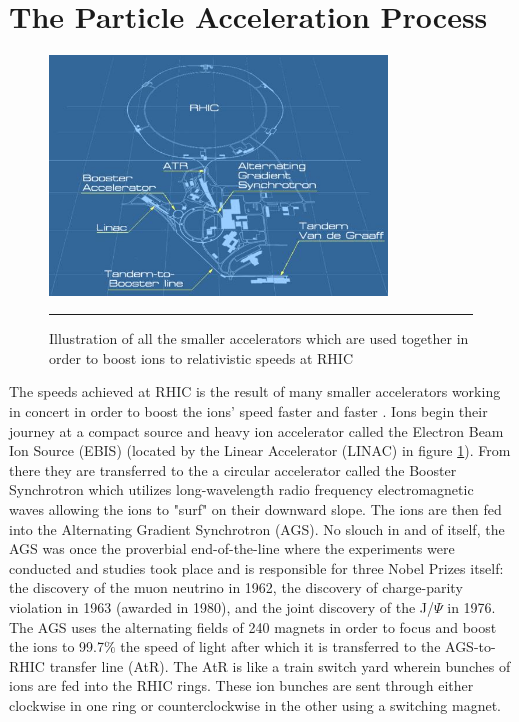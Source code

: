 \section{The Particle Acceleration Process}
\begin{figure}[htbp]
  \centering
    \includegraphics[width=0.8\textwidth]{Figures/RHICdiagram.JPG}
    \rule{35em}{0.5pt}
  \caption[Illustration of all the accelerators used to boost ions to relativistic speeds at RHIC]{Illustration of all the smaller accelerators which are used together in order to boost ions to relativistic speeds at RHIC}
  \label{fig:RHICdiagram}
\end{figure}
The speeds achieved at RHIC is the result of many smaller accelerators working in concert in order to boost the ions' speed faster and faster \citep{RHICaccel}.  Ions begin their journey at a compact source and heavy ion accelerator called the Electron Beam Ion Source (EBIS) (located by the Linear Accelerator (LINAC) in figure \ref{fig:RHICdiagram}). From there they are transferred to the a circular accelerator called the Booster Synchrotron which utilizes long-wavelength radio frequency electromagnetic waves allowing the ions to "surf" on their downward slope. The ions are then fed into the Alternating Gradient Synchrotron (AGS). No slouch in and of itself, the AGS was once the proverbial end-of-the-line where the experiments were conducted and studies took place and is responsible for three Nobel Prizes itself: the discovery of the muon neutrino in 1962, the discovery of charge-parity violation in 1963 (awarded in 1980), and the joint discovery of the J/$\Psi$ in 1976. The AGS uses the alternating fields of 240 magnets in order to focus and boost the ions to 99.7$\%$ the speed of light after which it is transferred to the AGS-to-RHIC transfer line (AtR). The AtR is like a train switch yard wherein bunches of ions are fed into the RHIC rings. These ion bunches are sent through either clockwise in one ring or counterclockwise in the other using a switching magnet.

